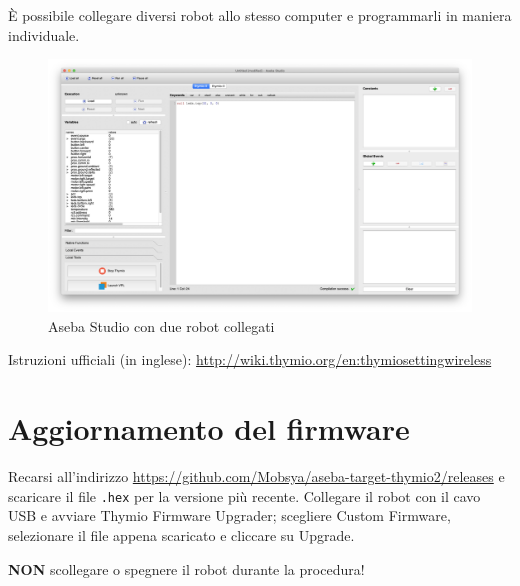 \documentclass[12pt]{article}
\begin{document}
	È possibile collegare diversi robot allo stesso computer e programmarli in maniera individuale.
	
	\begin{figure}[H]
		\includegraphics[width=\textwidth]{img/multiRobot.png}
		\caption{Aseba Studio con due robot collegati}
		\label{multiRobot}
	\end{figure}
	
	
	Istruzioni ufficiali (in inglese): \url{http://wiki.thymio.org/en:thymiosettingwireless}

		
\section{Aggiornamento del firmware}

	Recarsi all'indirizzo \url{https://github.com/Mobsya/aseba-target-thymio2/releases} e scaricare il file \texttt{.hex} per la versione più recente. Collegare il robot con il cavo USB e avviare Thymio Firmware Upgrader; scegliere Custom Firmware, selezionare il file appena scaricato e cliccare su Upgrade. 
	
	
	\textbf{NON} scollegare o spegnere il robot durante la procedura!
	
\end{document}
